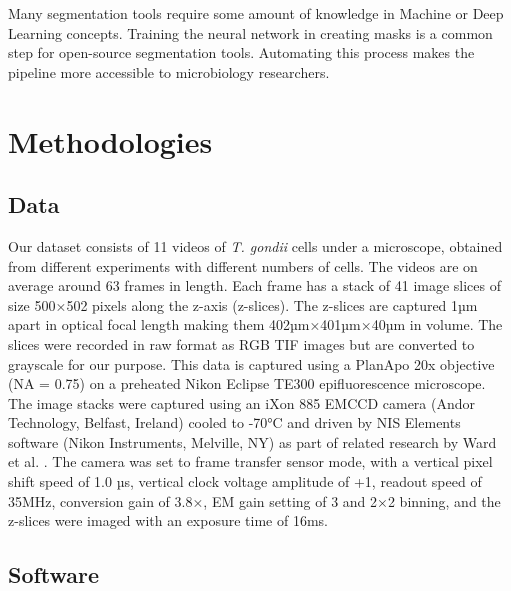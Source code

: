 \documentclass[./dissertation.tex]{subfiles}
\begin{document}
Many segmentation tools require some amount of knowledge in Machine or Deep Learning concepts. Training the neural network in creating masks is a common step for open-source segmentation tools. Automating this process makes the pipeline more accessible to microbiology researchers.

\section{Methodologies}
\subsection{Data}
Our dataset consists of 11 videos of \textit{\textit{T. gondii}} cells under a microscope, obtained from different experiments with different numbers of cells. The videos are on average around 63 frames in length. Each frame has a stack of 41 image slices of size 500×502 pixels along the z-axis (z-slices). The z-slices are captured 1µm apart in optical focal length making them 402µm×401µm×40µm in volume. The slices were recorded in raw format as RGB TIF images but are converted to grayscale for our purpose. This data is captured using a PlanApo 20x objective (NA = 0.75) on a preheated Nikon Eclipse TE300 epifluorescence microscope. The image stacks were captured using an iXon 885 EMCCD camera (Andor Technology, Belfast, Ireland) cooled to -70°C and driven by NIS Elements software (Nikon Instruments, Melville, NY) as part of related research by Ward et al. \cite{TgPHIL1}. The camera was set to frame transfer sensor mode, with a vertical pixel shift speed of 1.0 µs, vertical clock voltage amplitude of +1, readout speed of 35MHz, conversion gain of 3.8×, EM gain setting of 3 and 2×2 binning, and the z-slices were imaged with an exposure time of 16ms.

\subsection{Software}
\end{document}

